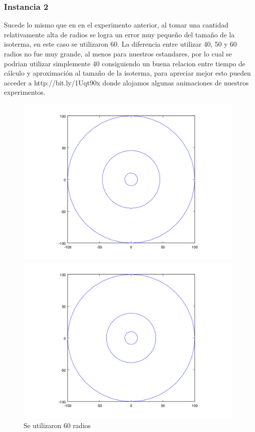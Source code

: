 \subsubsection{Instancia 2}

  \footnotesize{Sucede lo mismo que en en el experimento anterior, al tomar una cantidad relativamente alta de radios se logra un error muy pequeño del tamaño de la isoterma, en este caso se utilizaron 60. La diferencia entre utilizar 40, 50 y 60 radios no fue muy grande, al menos para nuestros estandares, por lo cual se podrian utilizar simplemente 40 consiguiendo un buena relacion entre tiempo de cálculo y aproximación al tamaño de la isoterma, para apreciar mejor esto pueden acceder a http://bit.ly/1Uqt90x donde alojamos algunas animaciones de nuestros experimentos.}

\begin{figure}[H]
\centering
\begin{minipage}{0.48\textwidth}
  \centering
    \includegraphics[width=1\textwidth]{imgs/comp_rads_malo/comp_rads_iso5.png}
	\caption{Se utilizaron 60 radios}  
  \label{fig:Radios3}
\end{minipage}%
\hspace{0.03\textwidth}
\begin{minipage}{0.48\textwidth}   
  \centering
    \includegraphics[width=1\textwidth]{imgs/comp_rads_malo/comp_rads_iso0.png} 

\end{minipage}
\end{figure}
